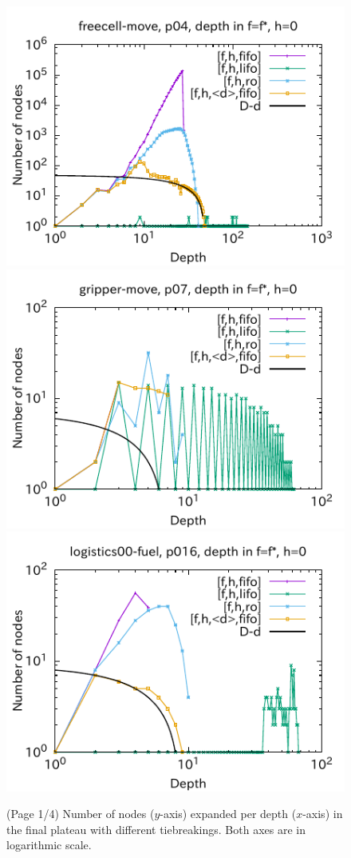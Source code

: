 \begin{figure}[htbp]
\includegraphics{img/output-lmcut/freecell-move/p04.pdf}
\includegraphics{img/output-lmcut/gripper-move/p07.pdf}
\includegraphics{img/output-lmcut/logistics00-fuel/p016.pdf}
 \caption{(Page 1/4) Number of nodes ($y$-axis) expanded per depth ($x$-axis) in
 the final plateau with different tiebreakings. Both axes are in logarithmic scale.
 }
 \label{fig:depth-histogram}
\end{figure}

